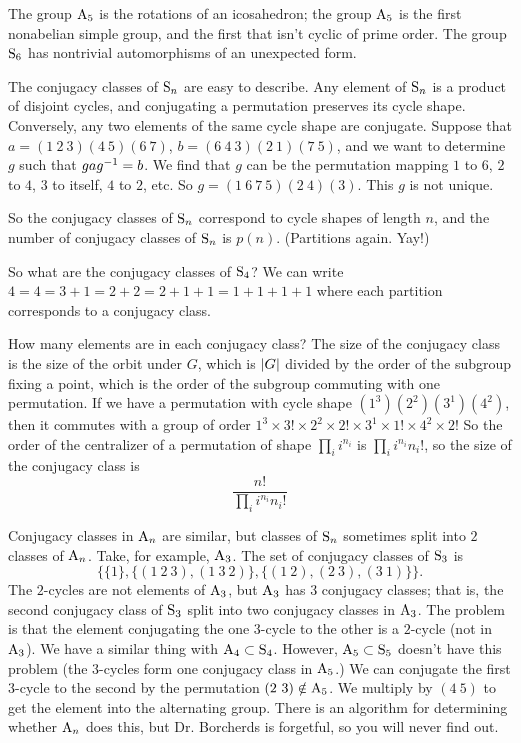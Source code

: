 \documentclass[11pt, oneside]{amsart}
\begin{document}
The group $\operatorname{A}_5$ is the rotations of an icosahedron; the group $\operatorname{A}_5$ is the first nonabelian simple group, and the first that isn't cyclic of prime order. The group $\operatorname{S}_6$ has nontrivial automorphisms of an unexpected form.

The conjugacy classes of $\operatorname{S}_n$ are easy to describe. Any element of $\operatorname{S}_n$ is a product of disjoint cycles, and conjugating a permutation preserves its cycle shape. Conversely, any two elements of the same cycle shape are conjugate. Suppose that
$a = (1\ 2\ 3)(4\ 5)(6\ 7)$, $b = (6\ 4\ 3)(2\ 1)(7\ 5)$, and we want to determine $g$ such that $gag^{-1} =b$. We find that $g$ can be the permutation mapping $1$ to $6$, $2$ to $4$, $3$ to itself, $4$ to $2$, etc. So $g = (1\ 6\ 7\ 5)(2\ 4)(3)$. This $g$ is not unique.

So the conjugacy classes of $\operatorname{S}_n$ correspond to cycle shapes of length $n$, and the number of conjugacy classes of $\operatorname{S}_n$ is $p(n)$. (Partitions again. Yay!)

So what are the conjugacy classes of $\operatorname{S}_4$? We can write $4 = 4 = 3+1 = 2+2 = 2+1 + 1 = 1+1+1+1$ where each partition corresponds to a conjugacy class. 

How many elements are in each conjugacy class? The size of the conjugacy class is the size of the orbit under $G$, which is $\left \lvert G \right \rvert$ divided by the order of the subgroup fixing a point, which is the order of the subgroup commuting with one permutation. If we have a permutation with cycle shape $(1^3)( 2^2 )(3^1)(4^2)$, then it commutes with a group of order $1^3 \times 3! \times 2^2 \times 2!\times 3^1 \times 1! \times 4^2 \times 2!$ So the order of the centralizer of a permutation of shape $\prod_ i i^{n_i}$ is $\prod_i i^{n_i} n_i!$, so the size of the conjugacy class is
$$
\frac{n!}{\prod_i i^{n_i} n_i!}
$$

Conjugacy classes in $\operatorname{A}_n$ are similar, but classes of $\operatorname{S}_n$ sometimes split into $2$ classes of $\operatorname{A}_n$. Take, for example, $\operatorname{A}_3$. The set of conjugacy classes of $\operatorname{S}_3$ is 
$$
\{\{1\}, \{(1\ 2\ 3), (1\ 3\ 2)\}, \{(1\ 2),(2\ 3),(3\ 1)\}\}.
$$
The $2$-cycles are not elements of $\operatorname{A}_3$, but $\operatorname{A}_3$ has $3$ conjugacy classes; that is, the second conjugacy class of $\operatorname{S}_3$ split into two conjugacy classes in $\operatorname{A}_3$. The problem is that the element conjugating the one $3$-cycle to the other is a $2$-cycle (not in $\operatorname{A}_3$). We have a similar thing with $\operatorname{A}_4 \subset \operatorname{S}_4$. However, $\operatorname{A}_5\subset \operatorname{S}_5$ doesn't have this problem (the $3$-cycles form one conjugacy class in $\operatorname{A}_5$.) We can conjugate the first $3$-cycle to the second by the permutation $(2\ 3)\notin \operatorname{A}_5$. We multiply by $(4\ 5)$ to get the element into the alternating group. There is an algorithm for determining whether $\operatorname{A}_n$ does this, but Dr. Borcherds is forgetful, so you will never find out.
\end{document}
